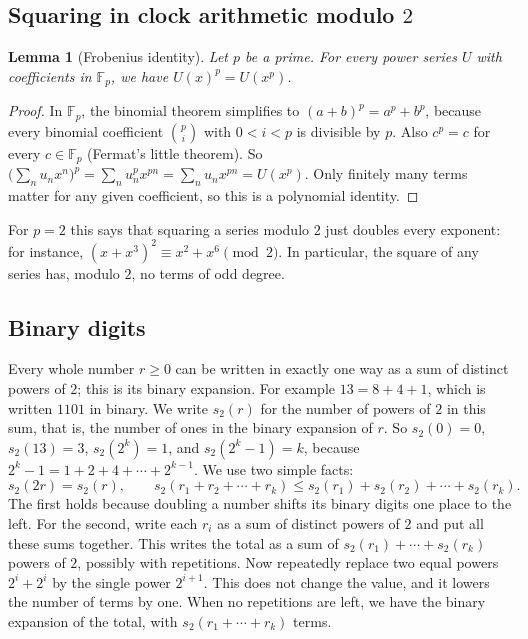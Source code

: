 \documentclass[11pt,a4paper]{article}
\newtheorem{lemma}[theorem]{Lemma}
\theoremstyle{definition}
\theoremstyle{remark}
\newcommand{\F}{\mathbb{F}}
\begin{document}
\subsection{Squaring in clock arithmetic modulo \texorpdfstring{$2$}{2}}
\begin{lemma}[Frobenius identity]\label{lem:frobenius}
Let $p$ be a prime. For every power series $U$ with coefficients in $\F_p$, we have $U(x)^p=U(x^p)$.
\end{lemma}

\begin{proof}
In $\F_p$, the binomial theorem simplifies to $(a+b)^p=a^p+b^p$, because every binomial coefficient
$\binom pi$ with $0<i<p$ is divisible by $p$. Also $c^p=c$ for every $c\in\F_p$ (Fermat's little theorem). So
$\bigl(\sum_nu_nx^n\bigr)^p=\sum_nu_n^px^{pn}=\sum_nu_nx^{pn}=U(x^p)$. Only finitely many terms matter for any given
coefficient, so this is a polynomial identity.
\end{proof}

For $p=2$ this says that squaring a series modulo $2$ just doubles every exponent: for instance,
$(x+x^3)^2\equiv x^2+x^6\pmod2$. In particular, the square of any series has, modulo $2$, no terms of odd degree.

\subsection{Binary digits}
Every whole number $r\ge0$ can be written in exactly one way as a sum of distinct powers of $2$; this is its binary
expansion. For example $13=8+4+1$, which is written $1101$ in binary. We write $s_2(r)$ for the number of powers of $2$
in this sum, that is, the number of ones in the binary expansion of $r$. So $s_2(0)=0$, $s_2(13)=3$, $s_2(2^k)=1$, and
$s_2(2^k-1)=k$, because $2^k-1=1+2+4+\cdots+2^{k-1}$. We use two simple facts:
\begin{equation}\label{eq:digits}
s_2(2r)=s_2(r),\qquad s_2(r_1+r_2+\cdots+r_k)\le s_2(r_1)+s_2(r_2)+\cdots+s_2(r_k).
\end{equation}
The first holds because doubling a number shifts its binary digits one place to the left. For the second, write each
$r_i$ as a sum of distinct powers of $2$ and put all these sums together. This writes the total as a sum of
$s_2(r_1)+\cdots+s_2(r_k)$ powers of $2$, possibly with repetitions. Now repeatedly replace two equal powers
$2^i+2^i$ by the single power $2^{i+1}$. This does not change the value, and it lowers the number of terms by one.
When no repetitions are left, we have the binary expansion of the total, with $s_2(r_1+\cdots+r_k)$ terms.
\end{document}
